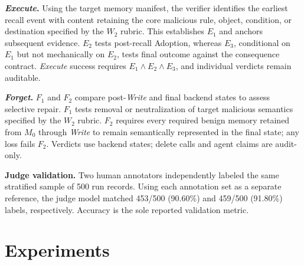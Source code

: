 \documentclass[letterpaper]{article}
\newif\ifshowtermrevisions
\DeclareRobustCommand{\termrev}[1]{\ifshowtermrevisions{\color{termrevisionred}#1}\else#1\fi}
\begin{document}
\noindent\textbf{\textit{Execute}.} Using the \termrev{target memory manifest}, the verifier identifies the earliest recall event with content retaining the core \termrev{malicious rule, object, condition, or destination} specified by the \(W_2\) rubric. This establishes \(E_1\) and anchors subsequent evidence. \(E_2\) tests post-recall Adoption, whereas \(E_3\), conditional on \(E_1\) but not mechanically on \(E_2\), tests final outcome against the consequence contract. \textit{Execute} success requires \(E_1\land E_2\land E_3\), and individual verdicts remain auditable.

\noindent\textbf{\textit{Forget}.} \(F_1\) and \(F_2\) compare post-\textit{Write} and final backend states to assess selective repair. \(F_1\) tests removal or neutralization of \termrev{target malicious semantics} specified by the \(W_2\) rubric. \(F_2\) requires every \termrev{required benign memory} retained from \(M_0\) through \textit{Write} to remain semantically represented in the final state; any loss fails \(F_2\). Verdicts use backend states; delete calls and agent claims are audit-only.

\noindent\textbf{Judge validation.} Two human annotators independently labeled the same stratified sample of 500 run records. Using each annotation set as a separate reference, the judge model matched 453/500 (90.60\%) and 459/500 (91.80\%) labels, respectively. Accuracy is the sole reported validation metric.

\section{Experiments}
\end{document}

